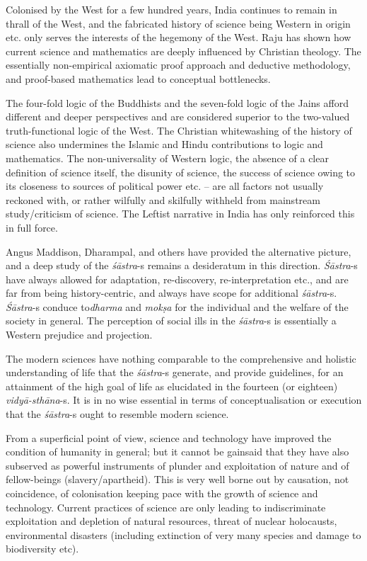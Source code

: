 Colonised by the West for a few hundred years, India continues to remain in thrall of the West, and the fabricated history of science being Western in origin etc. only serves the interests of the hegemony of the West. Raju has shown how current science and mathematics are deeply influenced by Christian theology. The essentially non-empirical axiomatic proof approach and deductive methodology, and proof-based mathematics lead to conceptual bottlenecks.

The four-fold logic of the Buddhists and the seven-fold logic of the Jains afford different and deeper perspectives and are considered superior to the two-valued truth-functional logic of the West. The Christian whitewashing of the history of science also undermines the Islamic and Hindu contributions to logic and mathematics. The non-universality of Western logic, the absence of a clear definition of science itself, the disunity of science, the success of science owing to its closeness to sources of political power etc. – are all factors not usually reckoned with, or rather wilfully and skilfully withheld from mainstream study/criticism of science. The Leftist narrative in India has only reinforced this in full force.

Angus Maddison, Dharampal, and others have provided the alternative picture, and a deep study of the \textit{śāstra}-s remains a desideratum in this direction. \textit{Śāstra}-s have always allowed for adaptation, re-dis\-covery, re-interpretation etc., and are far from being history-centric, and always have scope for additional \textit{śāstra}-s. \textit{Śāstra}-s conduce to\break \textit{dharma} and \textit{mokṣa} for the individual and the welfare of the society in general. The perception of social ills in the \textit{śāstra}-s is essentially a Western prejudice and projection.

The modern sciences have nothing comparable to the comprehensive and holistic understanding of life that the \textit{śāstra}-s generate, and provide guidelines, for an attainment of the high goal of life as elucidated in the fourteen (or eighteen) \textit{vidyā-sthāna}-s. It is in no wise essential in terms of conceptualisation or execution that the \textit{śāstra}-s ought to resemble modern science.

From a superficial point of view, science and technology have improved the condition of humanity in general; but it cannot be gainsaid that they have also subserved as powerful instruments of plunder and exploitation of nature and of fellow-beings (slavery/apartheid). This is very well borne out by causation, not coincidence, of colonisation keeping pace with the growth of science and technology. Current practices of science are only leading to indiscriminate exploitation and depletion of natural resources, threat of nuclear holocausts, environmental disasters (including extinction of very many species and damage to biodiversity etc).

